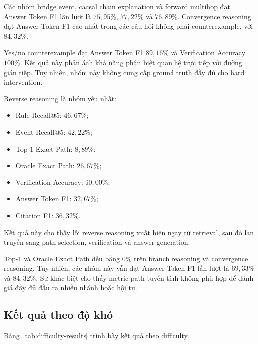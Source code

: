 Các nhóm bridge event, causal chain explanation và forward multihop đạt
Answer Token F1 lần lượt là \(75{,}95\%\), \(77{,}22\%\) và \(76{,}89\%\).
Convergence reasoning đạt Answer Token F1 cao nhất trong các câu hỏi không
phải counterexample, với \(84{,}32\%\).

Yes/no counterexample đạt Answer Token F1 \(89{,}16\%\) và Verification
Accuracy \(100\%\). Kết quả này phản ánh khả năng phân biệt quan hệ trực tiếp
với đường gián tiếp. Tuy nhiên, nhóm này không cung cấp ground truth đầy đủ
cho hard intervention.

Reverse reasoning là nhóm yếu nhất:

\begin{itemize}
    \item Rule Recall@5: \(46{,}67\%\);
    \item Event Recall@5: \(42{,}22\%\);
    \item Top-1 Exact Path: \(8{,}89\%\);
    \item Oracle Exact Path: \(26{,}67\%\);
    \item Verification Accuracy: \(60{,}00\%\);
    \item Answer Token F1: \(32{,}67\%\);
    \item Citation F1: \(36{,}32\%\).
\end{itemize}

Kết quả này cho thấy lỗi reverse reasoning xuất hiện ngay từ retrieval, sau
đó lan truyền sang path selection, verification và answer generation.

Top-1 và Oracle Exact Path đều bằng \(0\%\) trên branch reasoning và
convergence reasoning. Tuy nhiên, các nhóm này vẫn đạt Answer Token F1 lần
lượt là \(69{,}33\%\) và \(84{,}32\%\). Sự khác biệt cho thấy metric path
tuyến tính không phù hợp để đánh giá đầy đủ đầu ra nhiều nhánh hoặc hội tụ.

\subsection{Kết quả theo độ khó}

Bảng~\ref{tab:difficulty-results} trình bày kết quả theo difficulty.

